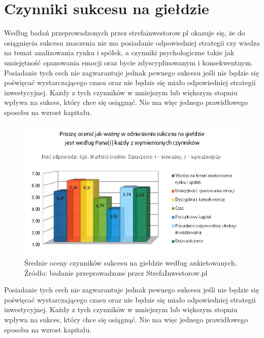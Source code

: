 \documentclass{report}
\begin{document}
\section{Czynniki sukcesu na giełdzie}
Według badań przeprowadzonych przez strefainwestorow.pl\cite{badania13} okazuje się, że do osiągnięcia sukcesu znaczenia nie ma posiadanie odpowiedniej strategii czy wiedza na temat analizowania rynku i spółek, a czynniki psychologiczne takie jak umiejętność opanowania emocji oraz bycie zdyscyplinowanym i konsekwentnym. Posiadanie tych cech nie zagwarantuje jednak pewnego sukcesu jeśli nie będzie się poświęcać wystarczającego czasu oraz nie będzie się miało odpowiedniej strategii inwestycyjnej. Każdy z tych czynników w mniejszym lub większym stopniu wpływa na sukces, który chce się osiągnąć. Nie ma więc jednego prawidłowego sposobu na wzrost kapitału.
\begin{figure}[h]
\centering
\includegraphics[scale=0.48]{obraz1}
\caption{Średnie oceny czynników sukcesu na giełdzie według ankietowanych. Źródło: badanie przeprowadzone przez StrefaInwestorow.pl}
\end{figure}
\newline Posiadanie tych cech nie zagwarantuje jednak pewnego sukcesu jeśli nie będzie się poświęcać wystarczającego czasu oraz nie będzie się miało odpowiedniej strategii inwestycyjnej. Każdy z tych czynników w mniejszym lub większym stopniu wpływa na sukces, który chce się osiągnąć. Nie ma więc jednego prawidłowego sposobu na wzrost kapitału.
\end{document}
